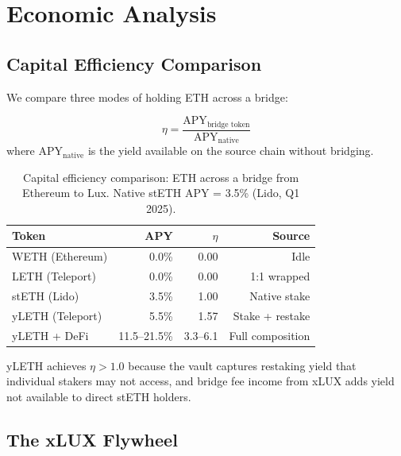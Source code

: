 \section{Economic Analysis}
\label{sec:economics}

\subsection{Capital Efficiency Comparison}

We compare three modes of holding ETH across a bridge:

\begin{definition}
\begin{equation}\label{eq:capital_efficiency}
  \eta = \frac{\text{APY}_{\text{bridge token}}}{\text{APY}_{\text{native}}}
\end{equation}
where $\text{APY}_{\text{native}}$ is the yield available on the source chain without bridging.
\end{definition}

\begin{table}[h]
\centering
\small
\caption{Capital efficiency comparison: ETH across a bridge from Ethereum to Lux. Native stETH APY = 3.5\% (Lido, Q1 2025).}
\label{tab:capital_efficiency}
\begin{tabular}{@{}lrrr@{}}
\toprule
\textbf{Token} & \textbf{APY} & \textbf{$\eta$} & \textbf{Source} \\
\midrule
WETH (Ethereum) & 0.0\% & 0.00 & Idle \\
LETH (Teleport) & 0.0\% & 0.00 & 1:1 wrapped \\
stETH (Lido) & 3.5\% & 1.00 & Native stake \\
yLETH (Teleport) & 5.5\% & 1.57 & Stake + restake \\
yLETH + DeFi & 11.5--21.5\% & 3.3--6.1 & Full composition \\
\bottomrule
\end{tabular}
\end{table}

\noindent
yLETH achieves $\eta > 1.0$ because the vault captures restaking yield that individual stakers may not access, and bridge fee income from xLUX adds yield not available to direct stETH holders.

\subsection{The xLUX Flywheel}\label{sec:flywheel}


